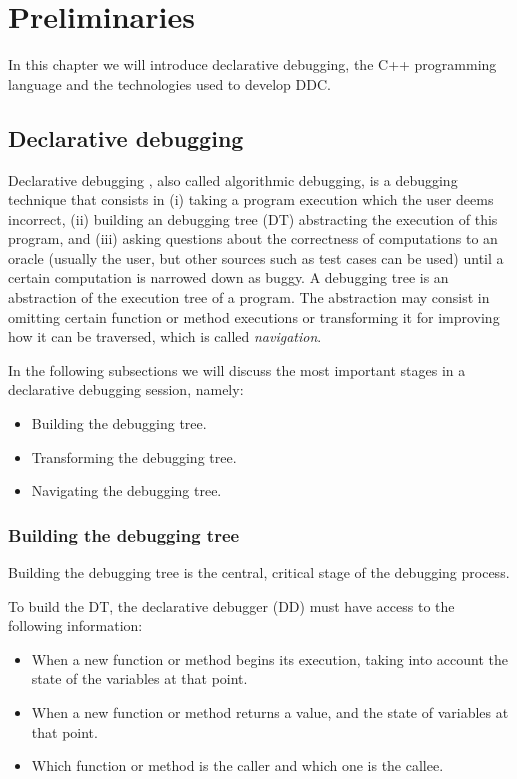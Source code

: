 \chapter{Preliminaries}
\label{cap:preliminaries}

In this chapter we will introduce declarative debugging, the C++ programming language and the technologies used to develop DDC.

\section{Declarative debugging}
Declarative debugging \cite{shapiro1982algorithmic}, also called algorithmic debugging, is a debugging technique that consists in (i) taking a program execution which the user deems incorrect, (ii) building an debugging tree (DT) abstracting the execution of this program, and (iii) asking questions about the correctness of computations to an oracle (usually the user, but other sources such as test cases can be used) until a certain computation is narrowed down as buggy.
A debugging tree is an abstraction of the execution tree of a program. The abstraction may consist in omitting certain function or method executions or transforming it for improving how it can be traversed, which is called \emph{navigation}. 

In the following subsections we will discuss the most important stages in a declarative debugging session, namely:
\begin{itemize}
    \item Building the debugging tree.
    \item Transforming the debugging tree.
    \item Navigating the debugging tree.
\end{itemize}

\subsection{Building the debugging tree}

Building the debugging tree is the central, critical stage of the debugging process.

To build the DT, the declarative debugger (DD) must have access to the following information:
\begin{itemize}
    \item When a new function or method begins its execution, taking into account the state of the variables at that point.
    \item When a new function or method returns a value, and the state of variables at that point.
    \item Which function or method is the caller and which one is the callee.
\end{itemize}


